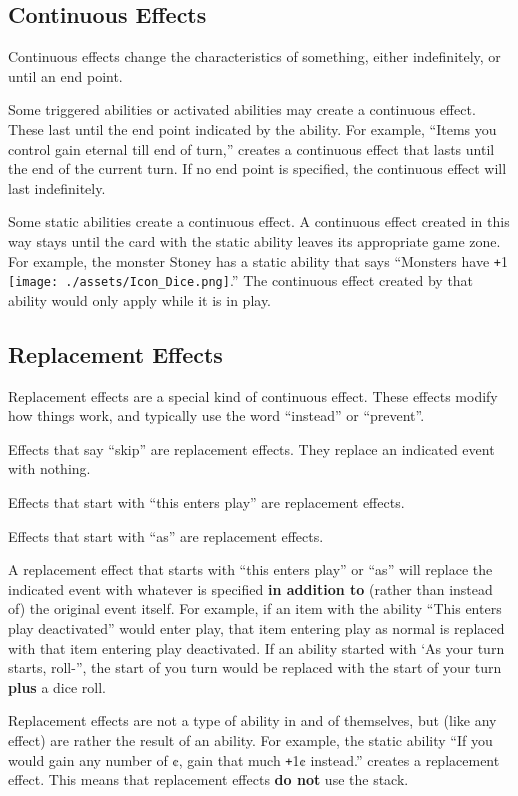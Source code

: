 \documentclass[10pt, a4paper, twoside]{article} %
\newcommand{\dice}{\texttt{[image: ./assets/Icon\_Dice.png]}}
\def\plus{\texttt{+}}
\begin{document}
    \subsection{Continuous Effects}
    Continuous effects change the characteristics of something, either indefinitely, or until an end point.

    Some triggered abilities or activated abilities may create a continuous effect. These last until the end point indicated by the ability. For example, “Items you control gain eternal till end of turn,” creates a continuous effect that lasts until the end of the current turn. If no end point is specified, the continuous effect will last indefinitely.

    Some static abilities create a continuous effect. A continuous effect created in this way stays until the card with the static ability leaves its appropriate game zone. For example, the monster Stoney has a static ability that says “Monsters have \plus1 \dice.” The continuous effect created by that ability would only apply while it is in play.

    \subsection{Replacement Effects}
    Replacement effects are a special kind of continuous effect. These effects modify how things work, and typically use the word “instead” or “prevent”.

    Effects that say “skip” are replacement effects. They replace an indicated event with nothing.

    Effects that start with “this enters play” are replacement effects.

    Effects that start with “as” are replacement effects.

    A replacement effect that starts with “this enters play” or “as” will replace the indicated event with whatever is specified \textbf{in addition to} (rather than instead of) the original event itself. For example, if an item with the ability “This enters play deactivated” would enter play, that item entering play as normal is replaced with that item entering play deactivated. If an ability started with ‘As your turn starts, roll-”, the start of you turn would be replaced with the start of your turn \textbf{plus} a dice roll.

    Replacement effects are not a type of ability in and of themselves, but (like any effect) are rather the result of an ability. For example, the static ability “If you would gain any number of ¢, gain that much \plus1¢ instead.” creates a replacement effect. This means that replacement effects \textbf{do not} use the stack.
\end{document}
